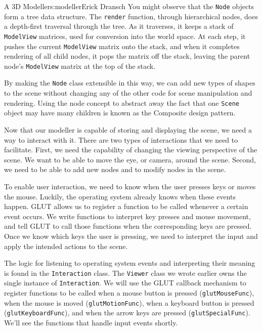 \begin{aosachapter}{A 3D Modeller}{s:modeller}{Erick Dransch}
You might observe that the \texttt{Node} objects form a tree data
structure. The \texttt{render} function, through hierarchical nodes,
does a depth-first traversal through the tree. As it traverses, it keeps
a stack of \texttt{ModelView} matrices, used for conversion into the
world space. At each step, it pushes the current \texttt{ModelView}
matrix onto the stack, and when it completes rendering of all child
nodes, it pops the matrix off the stack, leaving the parent node's
\texttt{ModelView} matrix at the top of the stack.

By making the \texttt{Node} class extensible in this way, we can add new
types of shapes to the scene without changing any of the other code for
scene manipulation and rendering. Using the node concept to abstract
away the fact that one \texttt{Scene} object may have many children is
known as the Composite design pattern.

\label{user-interaction}

Now that our modeller is capable of storing and displaying the scene, we
need a way to interact with it. There are two types of interactions that
we need to facilitate. First, we need the capability of changing the
viewing perspective of the scene. We want to be able to move the eye, or
camera, around the scene. Second, we need to be able to add new nodes
and to modify nodes in the scene.

To enable user interaction, we need to know when the user presses keys
or moves the mouse. Luckily, the operating system already knows when
these events happen. GLUT allows us to register a function to be called
whenever a certain event occurs. We write functions to interpret key
presses and mouse movement, and tell GLUT to call those functions when
the corresponding keys are pressed. Once we know which keys the user is
pressing, we need to interpret the input and apply the intended actions
to the scene.

The logic for listening to operating system events and interpreting
their meaning is found in the \texttt{Interaction} class. The
\texttt{Viewer} class we wrote earlier owns the single instance of
\texttt{Interaction}. We will use the GLUT callback mechanism to
register functions to be called when a mouse button is pressed
(\texttt{glutMouseFunc}), when the mouse is moved
(\texttt{glutMotionFunc}), when a keyboard button is pressed
(\texttt{glutKeyboardFunc}), and when the arrow keys are pressed
(\texttt{glutSpecialFunc}). We'll see the functions that handle input
events shortly.


\end{aosachapter}
